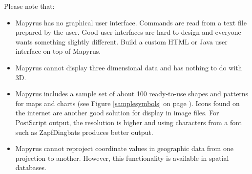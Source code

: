 
Please note that:

\begin{itemize}

\item
Mapyrus has no graphical user interface.
Commands are read from a text file prepared by the user.
Good user interfaces are
hard to design and everyone wants something slightly different.
Build a custom HTML or Java user interface on top of Mapyrus.

\item
Mapyrus cannot display three dimensional data and has nothing to do
with 3D.

\item
Mapyrus includes a sample set of about 100 ready-to-use shapes and patterns
for maps and charts (see Figure \ref{samplesymbols}
on page \pageref{samplesymbols}).
Icons found on the
internet are another good solution for display in image files.
For PostScript output, the resolution is higher and using characters
from a font such as ZapfDingbats produces better output.

\item
Mapyrus cannot reproject coordinate values in geographic data from
one projection to another.  However, this functionality
is available in spatial databases.
\end{itemize}

